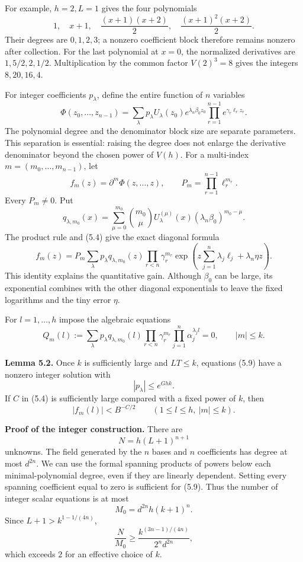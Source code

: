 \documentclass[
  11pt,
  a4paper,
]{article}
\begin{document}
For example, \(h=2,L=1\) gives the four polynomials \[
1,\quad x+1,\quad\frac{(x+1)(x+2)}2,\quad
\frac{(x+1)^2(x+2)}2.
\] Their degrees are \(0,1,2,3\); a nonzero coefficient block therefore
remains nonzero after collection. For the last polynomial at \(x=0\),
the normalized derivatives are \(1,5/2,2,1/2\). Multiplication by the
common factor \(V(2)^3=8\) gives the integers \(8,20,16,4\).

For integer coefficients \(p_\lambda\), define the entire function of
\(n\) variables \[
\Phi(z_0,\ldots,z_{n-1})
=\sum_\lambda p_\lambda
U_\lambda(z_0)
e^{\lambda_n\beta_0z_0}
\prod_{r=1}^{n-1}e^{\gamma_r\ell_rz_r}. \tag{5.6}
\] The polynomial degree and the denominator block size are separate
parameters. This separation is essential: raising the degree does not
enlarge the derivative denominator beyond the chosen power of \(V(h)\).
For a multi-index \(m=(m_0,\ldots,m_{n-1})\), let \[
f_m(z)=\partial^m\Phi(z,\ldots,z),\qquad
P_m=\prod_{r=1}^{n-1}\ell_r^{m_r}.
\] Every \(P_m\ne0\). Put \[
q_{\lambda,m_0}(x)=
\sum_{\mu=0}^{m_0}\binom{m_0}{\mu}
U_\lambda^{(\mu)}(x)
(\lambda_n\beta_0)^{m_0-\mu}. \tag{5.7}
\] The product rule and (5.4) give the exact diagonal formula \[
f_m(z)=P_m\sum_\lambda p_\lambda q_{\lambda,m_0}(z)
\prod_{r<n}\gamma_r^{m_r}
\exp\left(z\sum_{j=1}^n\lambda_j\ell_j+\lambda_n\eta z\right). \tag{5.8}
\] This identity explains the quantitative gain. Although \(\beta_0\)
can be large, its exponential combines with the other diagonal
exponentials to leave the fixed logarithms and the tiny error \(\eta\).

For \(l=1,\ldots,h\) impose the algebraic equations \[
Q_m(l):=\sum_\lambda p_\lambda q_{\lambda,m_0}(l)
\prod_{r<n}\gamma_r^{m_r}\prod_{j=1}^n\alpha_j^{\lambda_jl}=0,
\qquad |m|\le k. \tag{5.9}
\]

\textbf{Lemma 5.2.} Once \(k\) is sufficiently large and \(LT\le k\),
equations (5.9) have a nonzero integer solution with \[
|p_\lambda|\le e^{Ghk}. \tag{5.10}
\] If \(C\) in (5.4) is sufficiently large compared with a fixed power
of \(k\), then \[
|f_m(l)|<B^{-C/2}\qquad(1\le l\le h,\ |m|\le k). \tag{5.11}
\]

\textbf{Proof of the integer construction.} There are \[
N=h(L+1)^{n+1}
\] unknowns. The field generated by the \(n\) bases and \(n\)
coefficients has degree at most \(d^{2n}\). We can use the formal
spanning products of powers below each minimal-polynomial degree, even
if they are linearly dependent. Setting every spanning coefficient equal
to zero is sufficient for (5.9). Thus the number of integer scalar
equations is at most \[
M_0=d^{2n}h(k+1)^n.
\] Since \(L+1>k^{1-1/(4n)}\), \[
\frac N{M_0}\ge
\frac{k^{(3n-1)/(4n)}}{2^n d^{2n}}, \tag{5.12}
\] which exceeds \(2\) for an effective choice of \(k\).
\end{document}
